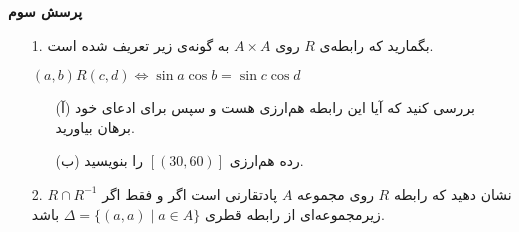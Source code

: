 \textbf{پرسش سوم}\\[0.1in]
\begin{enumerate}
    \item[1. ]
بگمارید که 
رابطه‌ی $R$ روی $A \times A$ به گونه‌ی زیر تعریف شده است.\\
\begin{center}
    $(a, b)R(c, d) \Leftrightarrow \sin a \cos b = \sin c \cos d$
\end{center}
\begin{enumerate}
    \item[(آ)]
     ‌بررسی كنيد كه آيا اين رابطه هم‌ارزی هست و سپس برای ادعای خود برهان بياوريد. 
     \\[0.02in]
    \item[(ب)]
     رده هم‌ارزی 
     $[(30, 60)]$
     را بنويسيد.\\[0.1in]
\end{enumerate}
\item[2.]
نشان دهید که رابطه $R$ 
روی مجموعه $A$
پادتقارنی است اگر و فقط اگر $R\cap R^{-1}$
زيرمجموعه‌ای از رابطه قطری
$\Delta = \{(a, a)\; | \; a \in A \}$
باشد.
\end{enumerate}